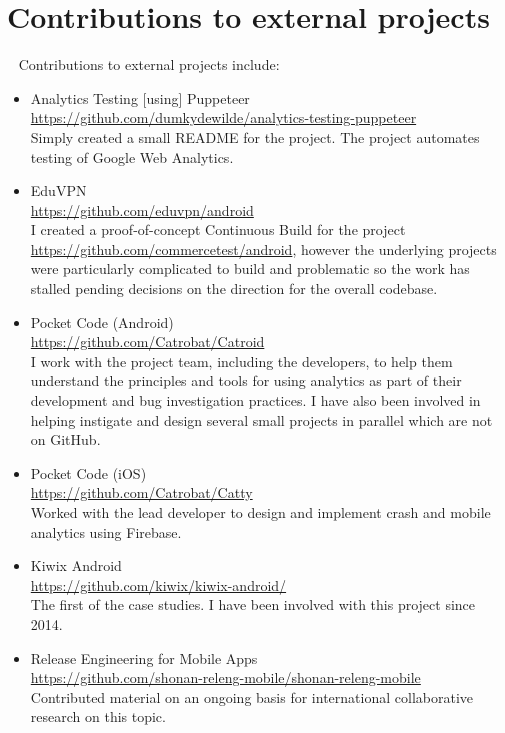 \section{Contributions to external projects}~\label{sec:contributions-to-external-projects}
Contributions to external projects include:
\begin{itemize}
    \item Analytics Testing [using] Puppeteer\\ \url{https://github.com/dumkydewilde/analytics-testing-puppeteer}\\ Simply created a small README for the project. The project automates testing of Google Web Analytics.
    
    \item EduVPN\\
    \url{https://github.com/eduvpn/android}\\
    I created a proof-of-concept Continuous Build for the project \url{https://github.com/commercetest/android}, however the underlying projects were particularly complicated to build and problematic so the work has stalled pending decisions on the direction for the overall codebase.
    
    \item Pocket Code (Android)\\
    \url{https://github.com/Catrobat/Catroid}\\
    I work with the project team, including the developers, to help them understand the principles and tools for using analytics as part of their development and bug investigation practices. I have also been involved in helping instigate and design several small projects in parallel which are not on GitHub.
    
    \item Pocket Code (iOS)\\
    \url{https://github.com/Catrobat/Catty}\\
    Worked with the lead developer to design and implement crash and mobile analytics using Firebase.
    
    \item Kiwix Android\\
    \url{https://github.com/kiwix/kiwix-android/}\\
    The first of the case studies. I have been involved with this project since 2014.

    \item Release Engineering for Mobile Apps\\ \url{https://github.com/shonan-releng-mobile/shonan-releng-mobile}\\ Contributed material on an ongoing basis for international collaborative research on this topic. 
\end{itemize}


